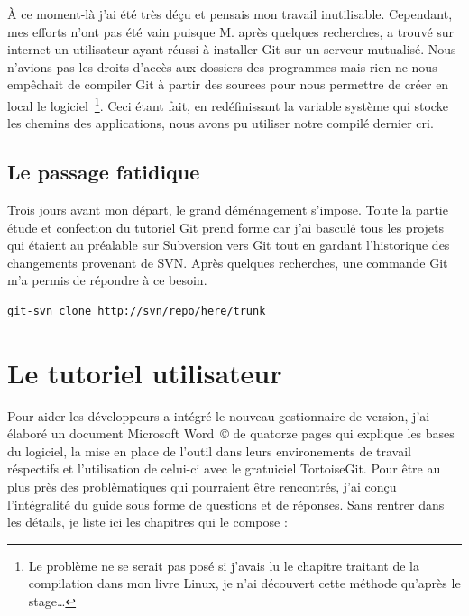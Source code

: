 À ce moment-là j'ai été très déçu et pensais mon travail inutilisable.
Cependant, mes efforts n'ont pas été vain puisque M. après
quelques recherches, a trouvé sur internet un utilisateur ayant réussi à
installer Git sur un serveur mutualisé.  Nous n'avions pas les droits d'accès
aux dossiers des programmes mais rien ne nous empêchait de compiler Git à
partir des sources pour nous permettre de créer en local le logiciel\,
\footnote{Le problème ne se serait pas posé si j'avais lu le chapitre traitant
de la compilation dans mon livre Linux, je n'ai découvert cette méthode
qu'après le stage\dots}. Ceci étant fait, en redéfinissant la variable système
qui stocke les chemins des applications, nous avons pu utiliser notre compilé
dernier cri.

\subsection{Le passage fatidique} %
\label{sub:Le passage fatidique}

Trois jours avant mon départ, le grand déménagement s'impose. Toute la partie
étude et confection du tutoriel Git prend forme car j'ai basculé tous les
projets qui étaient au préalable sur Subversion vers Git tout en gardant
l'historique des changements provenant de SVN. Après quelques recherches, une
commande Git m'a permis de répondre à ce besoin.\\

\begin{lstlisting}[basicstyle=\ttfamily\small, frame=trBL]
git-svn clone http://svn/repo/here/trunk
\end{lstlisting}

\section{Le tutoriel utilisateur} %
\label{sec:Le tutoriel utilisateur}

Pour aider les développeurs a intégré le nouveau gestionnaire de version, j'ai
élaboré un document Microsoft Word~\copyright{} de quatorze pages qui explique
les bases du logiciel, la mise en place de l'outil dans leurs environements de
travail réspectifs et l'utilisation de celui-ci avec le gratuiciel TortoiseGit.
Pour être au plus près des problèmatiques qui pourraient être rencontrés, j'ai
conçu l'intégralité du guide sous forme de questions et de réponses. Sans
rentrer dans les détails, je liste ici les chapitres qui le compose :

